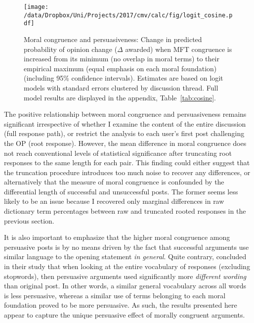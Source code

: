\begin{figure}[ht]
\centering
\texttt{[image: /data/Dropbox/Uni/Projects/2017/cmv/calc/fig/logit\_cosine.pdf]}
\caption[Moral congruence and persuasiveness]{Moral congruence and persuasiveness: Change in predicted probability of opinion change ($\Delta$ awarded) when MFT congruence is increased from its minimum (no overlap in moral terms) to their empirical maximum (equal emphasis on each moral foundation) (including 95\% confidence intervals). Estimates are based on logit models with standard errors clustered by discussion thread. Full model results are displayed in the appendix, Table~\ref{tab:cosine}.}\label{fig:cosine}
\end{figure}

The positive relationship between moral congruence and persuasiveness remains significant irrespective of whether I examine the content of the entire discussion (full response path), or restrict the analysis to each user's first post challenging the OP (root response). However, the mean difference in moral congruence does not reach conventional levels of statistical significance after truncating root responses to the same length for each pair. This finding could either suggest that the truncation procedure introduces too much noise to recover any differences, or alternatively that the measure of moral congruence is confounded by the differential length of successful and unsuccessful posts. The former seems less likely to be an issue because I recovered only marginal differences in raw dictionary term percentages between raw and truncated rooted responses in the previous section.

It is also important to emphasize that the higher moral congruence among persuasive posts is by no means driven by the fact that successful arguments use similar language to the opening statement \textit{in general}. Quite contrary, \citet[618]{tan2016winning} concluded in their study that when looking at the entire vocabulary of responses (excluding stopwords),  then persuasive arguments used significantly more \textit{different wording} than original post. In other words, a similar general vocabulary across all words is less persuasive, whereas a similar use of terms belonging to each moral foundation proved to be more persuasive. As such, the results presented here appear to capture the unique persuasive effect of morally congruent arguments.






